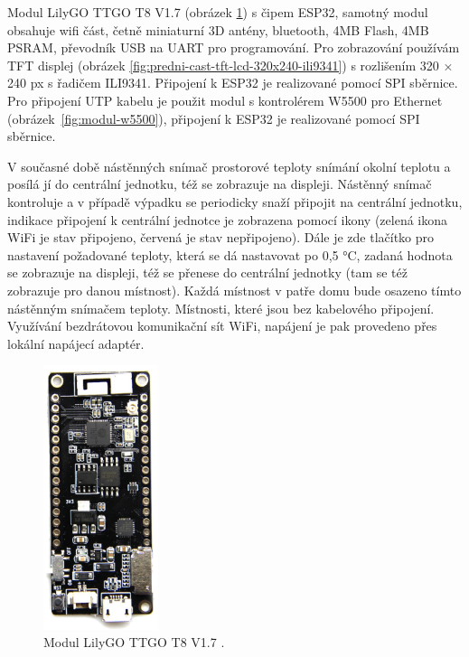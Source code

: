 Modul  LilyGO TTGO T8 V1.7 (obrázek \ref{fig:lilygo-ttgo-v1_7-eps32}) s čipem ESP32, samotný modul obsahuje wifi část, četně miniaturní 3D antény, bluetooth, 4MB Flash, 4MB PSRAM, převodník USB na UART pro programování. Pro zobrazování používám TFT displej (obrázek \ref{fig:predni-cast-tft-lcd-320x240-ili9341}) s rozlišením 320 × 240 px s řadičem ILI9341. Připojení k ESP32 je realizované pomocí SPI sběrnice. Pro  připojení UTP kabelu je použit modul s kontrolérem W5500 pro Ethernet (obrázek~\ref{fig:modul-w5500}), připojení k ESP32 je realizované pomocí SPI sběrnice. 

V současné době nástěnných snímač prostorové teploty snímání okolní teplotu a posílá jí do centrální jednotku, též se zobrazuje na displeji. Nástěnný snímač kontroluje a v případě výpadku se periodicky snaží připojit na centrální jednotku, indikace připojení k centrální jednotce je zobrazena pomocí ikony (zelená ikona WiFi je stav připojeno, červená je stav nepřipojeno). Dále je zde tlačítko pro nastavení požadované teploty, která se dá nastavovat po 0,5 °C, zadaná hodnota se zobrazuje na displeji, též se přenese do centrální jednotky (tam se též zobrazuje pro danou místnost). Každá místnost v patře domu bude osazeno tímto nástěnným snímačem teploty. Místnosti, které jsou bez kabelového připojení. Využívání bezdrátovou komunikační sít WiFi, napájení je pak provedeno přes lokální napájecí adaptér.

\begin{figure}[H]
    \centering
    \includegraphics[width=0.3\textwidth]{images/lilygo-ttgo-v1_7-eps32.png}
    \caption[Modul  LilyGO TTGO T8 V1.7.]{Modul  LilyGO TTGO T8 V1.7 \cite{lilygo-ttgo-v1_7-eps32}.}
    \label{fig:lilygo-ttgo-v1_7-eps32}
\end{figure}

